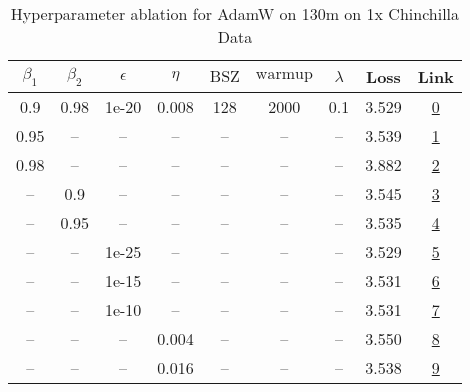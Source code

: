 \begin{table}[H]
\centering
\caption{Hyperparameter ablation for AdamW on 130m on 1x Chinchilla Data}
\label{tab:ablation_adamw_130m_1}
\begin{tabular}{ccccccccc}
\toprule
$\beta_1$ & $\beta_2$ & $\epsilon$ & $\eta$ & $\mathrm{BSZ}$ & $\mathrm{warmup}$ & $\lambda$ & Loss & Link \\
\midrule
0.9 & 0.98 & 1e-20 & 0.008 & 128 & 2000 & 0.1 & 3.529 & \href{https://wandb.ai/stanford-mercury/optimizer-scaling/runs/sweep-130m-2B-adamw5098e9lr0.008-wd0.1-minlr0-warmup2000-b10.9-b-bc5e36}{0} \\
\midrule
0.95 & -- & -- & -- & -- & -- & -- & 3.539 & \href{https://wandb.ai/stanford-mercury/optimizer-scaling/runs/sweep-130m-2B-adamw6b5e10lr0.008-wd0.1-minlr0-warmup2000-b10.95--b1de93}{1} \\
0.98 & -- & -- & -- & -- & -- & -- & 3.882 & \href{https://wandb.ai/stanford-mercury/optimizer-scaling/runs/sweep-130m-2B-adamwae7d4dlr0.008-wd0.1-minlr0-warmup2000-b10.98--df53b1}{2} \\
-- & 0.9 & -- & -- & -- & -- & -- & 3.545 & \href{https://wandb.ai/stanford-mercury/optimizer-scaling/runs/sweep-130m-2B-adamw5a9f1blr0.008-wd0.1-minlr0-warmup2000-b10.9-b-691bb8}{3} \\
-- & 0.95 & -- & -- & -- & -- & -- & 3.535 & \href{https://wandb.ai/stanford-mercury/optimizer-scaling/runs/sweep-130m-2B-adamwb5ba64lr0.008-wd0.1-minlr0-warmup2000-b10.9-b-77d771}{4} \\
-- & -- & 1e-25 & -- & -- & -- & -- & 3.529 & \href{https://wandb.ai/stanford-mercury/optimizer-scaling/runs/sweep-130m-2B-adamw0848aelr0.008-wd0.1-minlr0-warmup2000-b10.9-b-413f11}{5} \\
-- & -- & 1e-15 & -- & -- & -- & -- & 3.531 & \href{https://wandb.ai/stanford-mercury/optimizer-scaling/runs/sweep-130m-2B-adamwca195dlr0.008-wd0.1-minlr0-warmup2000-b10.9-b-1f0e34}{6} \\
-- & -- & 1e-10 & -- & -- & -- & -- & 3.531 & \href{https://wandb.ai/stanford-mercury/optimizer-scaling/runs/sweep-130m-2B-adamwb41b46lr0.008-wd0.1-minlr0-warmup2000-b10.9-b-0cf15c}{7} \\
-- & -- & -- & 0.004 & -- & -- & -- & 3.550 & \href{https://wandb.ai/stanford-mercury/optimizer-scaling/runs/sweep-130m-2B-adamw79cde5lr0.004-wd0.1-minlr0-warmup2000-b10.9-b-019ae3}{8} \\
-- & -- & -- & 0.016 & -- & -- & -- & 3.538 & \href{https://wandb.ai/stanford-mercury/optimizer-scaling/runs/sweep-130m-2B-adamw5f56aalr0.016-wd0.1-minlr0-warmup2000-b10.9-b-9972d1}{9} \\

\end{tabular}
\end{table}
